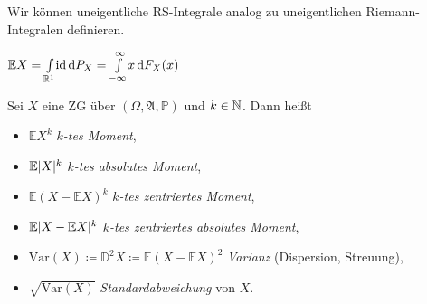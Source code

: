 \documentclass{cheat-sheet}
\newcommand{\Alg}{\mathfrak{A}} %
\renewcommand{\P}{\mathbb{P}} %
\newcommand{\E}{\mathbb{E}} %
\newcommand{\Var}{\mathrm{Var}} %
\begin{document}
\begin{bem}
  Wir können uneigentliche RS-Integrale analog zu uneigentlichen Riemann-Integralen definieren.
\end{bem}

\iffalse

  \[ \E X = \Int{- \infty}{\infty}{x}{F(x)} \]

  Falls $\lim{x \to \infty} x F_X(-x) = \lim{x \to \infty} x (1 - F_X(x)) = 0$, so gilt

  $\E X = \Int{0}{\infty}{1 - F_X(x) - F_X(-x)}{x}$, falls $\E |X| < \infty$

  $\E |X| = \Int{0}{\infty}{1 - F_X(x) - F_X(-x)}{x}$

  Genauso werden Erwartungswerte von Funktionen von $X$ berechnet, z.B. mit $x^2 F_X(-x) \xrightarrow{x \to \infty} 0$ und $x^2 (1 - F_X(x)) \xrightarrow{x \to \infty} 0$

  $\E X^2 = 2 \Int{0}{\infty}{x (1 - F_X(x) + F_X(-x))}{x} = \P(|X| > x)$ (falls $F_X$ stetig)

  $\E |X|^k = k \Int{0}{\infty}{x^{k-1} (1 - F_X(x) + F_X(-x))}{x}$
\fi

\begin{satz}
  $\E X = \Int{\R^1}{}{\id}{P_X} = \Int{-\infty}{\infty}{x}{F_X(x)}$
\end{satz}



\begin{defn}
  Sei $X$ eine ZG über $(\Omega, \Alg, \P)$ und $k \in \mathbb{N}$. Dann heißt
  \begin{itemize}
    \item $\E X^k$ \emph{$k$-tes Moment},
    \item $\E \abs{X}^k$ \emph{$k$-tes absolutes Moment},
    \item $\E (X - \E X)^k$ \emph{$k$-tes zentriertes Moment},
    \item $\E \abs{X - \E X}^k$ \emph{$k$-tes zentriertes absolutes Moment},
    \item $\Var(X) \coloneqq \mathbb{D}^2 X \coloneqq \E (X - \E X)^2$ \emph{Varianz} (Dispersion, Streuung),
    \item $\sqrt{\Var(X)}$ \emph{Standardabweichung} von $X$.
  \end{itemize}
\end{defn}
\end{document}
